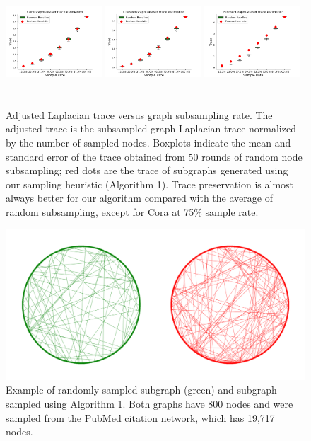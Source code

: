 \documentclass[conference]{IEEEtran}
\theoremstyle{definition}
\begin{document}
\begin{figure}[t]
\centering
\includegraphics[height=4cm,width=0.32\textwidth]{img/trace_revised/CoraGraphDataset_trace_boxplot.png}
\includegraphics[height=4cm,width=0.32\textwidth]{img/trace_revised/CiteseerGraphDataset_trace_boxplot.png}
\includegraphics[height=4cm,width=0.32\textwidth]{img/trace_revised/PubmedGraphDataset_trace_boxplot.png}
\caption{Adjusted Laplacian trace versus graph subsampling rate. The adjusted trace is the subsampled graph Laplacian trace normalized by the number of sampled nodes. Boxplots indicate the mean and standard error of the trace obtained from 50 rounds of random node subsampling; red dots are the trace of subgraphs generated using our sampling heuristic (Algorithm 1). Trace preservation is almost always better for our algorithm compared with the average of random subsampling, except for Cora at 75\% sample rate.}
\label{fig:trace}
\end{figure}

\begin{figure}
    \centering    \includegraphics[width=0.95\linewidth]{img/feature_heuristic.png}
    \caption{Example of randomly sampled subgraph (green) and subgraph sampled using Algorithm 1. Both graphs have 800 nodes and were sampled from the PubMed citation network, which has 19,717 nodes.}
    \label{fig:pubmed_example}
\end{figure}
\end{document}
